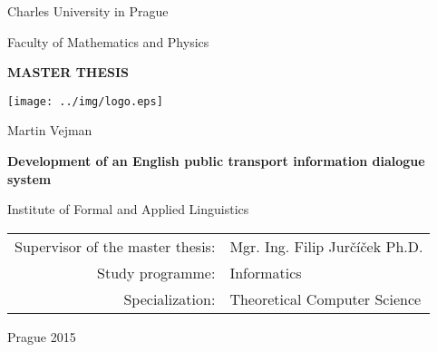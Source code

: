 \documentclass[12pt,a4paper]{report}
\begin{document}


\pagestyle{empty}
\begin{center}

\large

Charles University in Prague

\medskip

Faculty of Mathematics and Physics

\vfill

{\bf\Large MASTER THESIS}

\vfill

\centerline{\mbox{\texttt{[image: ../img/logo.eps]}}}

\vfill
\vspace{5mm}

{\LARGE Martin Vejman}

\vspace{15mm}

{\LARGE\bfseries Development of an English public transport information dialogue system}

\vfill

Institute of Formal and Applied Linguistics

\vfill

\begin{tabular}{rl}

Supervisor of the master thesis: & Mgr. Ing. Filip Jurčíček Ph.D. \\
\noalign{\vspace{2mm}}
Study programme: & Informatics \\
\noalign{\vspace{2mm}}
Specialization: & Theoretical Computer Science \\
\end{tabular}

\vfill

Prague 2015

\end{center}

\newpage


\end{document}
